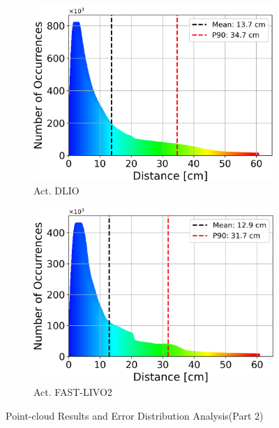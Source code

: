 \documentclass[english, bachelor, utf8]{base/thesis_telematics}
\begin{document}
\begin{figure}
\begin{subfigure}{0.29\textwidth}
    \centering
    \includegraphics[width=\textwidth]{pics/histogram_results/histogram_cond_actuated_dlio.png}
    \caption{Act. DLIO}
    \label{fig:hist_act_dlio}
\end{subfigure}
\begin{subfigure}{0.29\textwidth}
    \centering
    \includegraphics[width=\textwidth]{pics/histogram_results/histogram_cond_actuated_livo.png}
    \caption{Act. FAST-LIVO2}
    \label{fig:hist_act_livo}
\end{subfigure}\vspace{2mm}
    \caption{Point-cloud Results and Error Distribution Analysis(Part 2)}
    \label{fig:combined_results2}
\end{figure}
\end{document}
